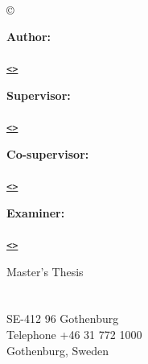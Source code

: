 \newpage
\thispagestyle{plain}
\textit{\thetitle}\\
\subtitle\\
\copyright\ \the\year ~ \textsc{\theauthor}
\vspace{4.5cm}

\setlength{\parskip}{0.5cm}
\textbf{Author:}\\
\theauthor\\
\href{mailto:\authoremail>}{\texttt{<\authoremail>}}

\textbf{Supervisor:}\\
\supervisor\\
\href{mailto:\supervisoremail>}{\texttt{<\supervisoremail>}}\\
\supervisordepartment

\textbf{Co-supervisor:}\\
\cosupervisor\\
\href{mailto:\cosupervisoremail>}{\texttt{<\cosupervisoremail>}}\\
\cosupervisordepartment

\textbf{Examiner:}\\
\examiner\\
\href{mailto:\examineremail>}{\texttt{<\examineremail>}}\\
\examinerdepartment

\vfill
Master's Thesis \the\year\\	%
\department\\
\institution\\
SE-412 96 Gothenburg\\
Telephone +46 31 772 1000 \setlength{\parskip}{0.5cm}\\
Gothenburg, Sweden \the\year


\tableofcontents
